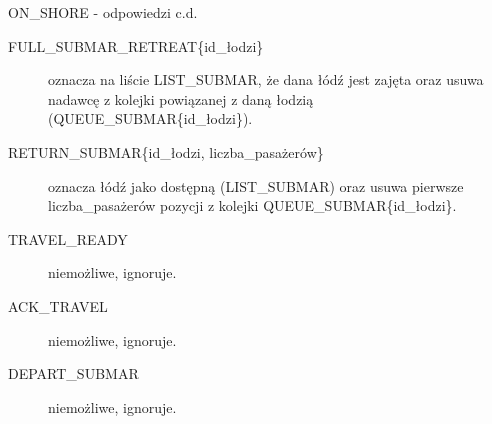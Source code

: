 \documentclass{beamer}
\begin{document}
\begin{frame}{ON\_SHORE - odpowiedzi c.d.}
    \internallinenumbers
    \begin{description}
        \item [FULL\_SUBMAR\_RETREAT\{id\_łodzi\}] oznacza na liście LIST\_SUBMAR, że dana łódź jest zajęta oraz usuwa nadawcę z kolejki powiązanej z daną łodzią (QUEUE\_SUBMAR\{id\_łodzi\}).
        \item [RETURN\_SUBMAR\{id\_łodzi, liczba\_pasażerów\}] oznacza łódź jako dostępną (LIST\_SUBMAR) oraz usuwa pierwsze liczba\_pasażerów pozycji z kolejki QUEUE\_SUBMAR\{id\_łodzi\}.
        \item [TRAVEL\_READY] niemożliwe, ignoruje.
        \item [ACK\_TRAVEL] niemożliwe, ignoruje.
        \item [DEPART\_SUBMAR] niemożliwe, ignoruje.
    \end{description}
\end{frame}
\end{document}
